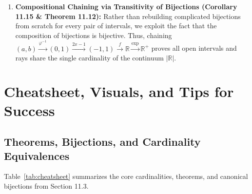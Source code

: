 \documentclass[11pt, letterpaper]{article}
\theoremstyle{definition}
\theoremstyle{remark}
\begin{document}
\begin{enumerate}
    \item \textbf{Compositional Chaining via Transitivity of Bijections (Corollary 11.15 \& Theorem 11.12):}
    Rather than rebuilding complicated bijections from scratch for every pair of intervals, we exploit the fact that the composition of bijections is bijective. Thus, chaining $(a, b) \xrightarrow{\varphi^{-1}} (0, 1) \xrightarrow{2x - 1} (-1, 1) \xrightarrow{f} \mathbb{R} \xrightarrow{\exp} \mathbb{R}^+$ proves all open intervals and rays share the single cardinality of the continuum $|\mathbb{R}|$.
\end{enumerate}

\section{Cheatsheet, Visuals, and Tips for Success}

\subsection{Theorems, Bijections, and Cardinality Equivalences}

Table~\ref{tab:cheatsheet} summarizes the core cardinalities, theorems, and canonical bijections from Section 11.3.
\end{document}
